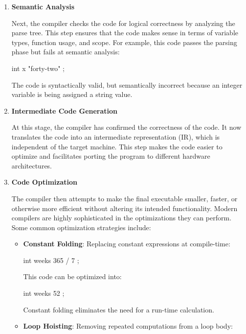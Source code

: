 \documentclass[12pt]{article}
\begin{document}
\begin{enumerate}
\item{\textbf{Semantic Analysis}}

\noindent
Next, the compiler checks the code for logical correctness by analyzing the parse tree.
This step ensures that the code makes sense in terms of variable types, function usage, and scope.
For example, this code passes the parsing phase but fails at semantic analysis:

\begin{cxx}{}
int x { "forty-two" };
\end{cxx}

\noindent
The code is syntactically valid, but semantically incorrect because an integer variable is being assigned a string value.

\item{\textbf{Intermediate Code Generation}}

\noindent
At this stage, the compiler has confirmed the correctness of the code.
It now translates the code into an intermediate representation (IR), which is independent of the target machine.
This step makes the code easier to optimize and facilitates porting the program to different hardware architectures.

\item{\textbf{Code Optimization}}

\noindent
The compiler then attempts to make the final executable smaller, faster, or otherwise more efficient without altering its intended functionality.
Modern compilers are highly sophisticated in the optimizations they can perform.
Some common optimization strategies include:

\begin{itemize}

\item{\textbf{Constant Folding}: Replacing constant expressions at compile-time:}

\begin{cxx}{}
int weeks { 365 / 7 };
\end{cxx}

\noindent
This code can be optimized into:

\begin{cxx}{}
int weeks { 52 };
\end{cxx}

\noindent
Constant folding eliminates the need for a run-time calculation.

\item{\textbf{Loop Hoisting}: Removing repeated computations from a loop body:}


\end{itemize}
\end{enumerate}
\end{document}
